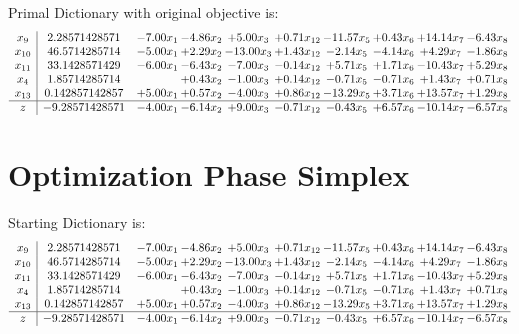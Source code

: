 \documentclass[9pt]{article}
\begin{document}
Primal Dictionary with original objective is:
\[\begin{array}{c| c c@{\hskip 2pt} c@{\hskip 2pt} c@{\hskip 2pt} c@{\hskip 2pt} c@{\hskip 2pt} c@{\hskip 2pt} c@{\hskip 2pt} c@{\hskip 2pt} }
 x_{9}   &  2.28571428571 & -7.00 x_{1} & -4.86 x_{2} & +  5.00 x_{3} & +  0.71 x_{12} & -11.57 x_{5} & +  0.43 x_{6} & + 14.14 x_{7} & -6.43 x_{8}\\
 x_{10}   &  46.5714285714 & -5.00 x_{1} & +  2.29 x_{2} & -13.00 x_{3} & +  1.43 x_{12} & -2.14 x_{5} & -4.14 x_{6} & +  4.29 x_{7} & -1.86 x_{8}\\
 x_{11}   &  33.1428571429 & -6.00 x_{1} & -6.43 x_{2} & -7.00 x_{3} & -0.14 x_{12} & +  5.71 x_{5} & +  1.71 x_{6} & -10.43 x_{7} & +  5.29 x_{8}\\
 x_{4}   &  1.85714285714  &   & +  0.43 x_{2} & -1.00 x_{3} & +  0.14 x_{12} & -0.71 x_{5} & -0.71 x_{6} & +  1.43 x_{7} & +  0.71 x_{8}\\
 x_{13}   &  0.142857142857 & +  5.00 x_{1} & +  0.57 x_{2} & -4.00 x_{3} & +  0.86 x_{12} & -13.29 x_{5} & +  3.71 x_{6} & + 13.57 x_{7} & +  1.29 x_{8}\\
\hline
z    &  -9.28571428571 & -4.00 x_{1} & -6.14 x_{2} & +  9.00 x_{3} & -0.71 x_{12} & -0.43 x_{5} & +  6.57 x_{6} & -10.14 x_{7} & -6.57 x_{8}\\
\end{array}\]
\section{Optimization Phase Simplex}
Starting Dictionary is:
\[\begin{array}{c| c c@{\hskip 2pt} c@{\hskip 2pt} c@{\hskip 2pt} c@{\hskip 2pt} c@{\hskip 2pt} c@{\hskip 2pt} c@{\hskip 2pt} c@{\hskip 2pt} }
 x_{9}   &  2.28571428571 & -7.00 x_{1} & -4.86 x_{2} & +  5.00 x_{3} & +  0.71 x_{12} & -11.57 x_{5} & +  0.43 x_{6} & + 14.14 x_{7} & -6.43 x_{8}\\
 x_{10}   &  46.5714285714 & -5.00 x_{1} & +  2.29 x_{2} & -13.00 x_{3} & +  1.43 x_{12} & -2.14 x_{5} & -4.14 x_{6} & +  4.29 x_{7} & -1.86 x_{8}\\
 x_{11}   &  33.1428571429 & -6.00 x_{1} & -6.43 x_{2} & -7.00 x_{3} & -0.14 x_{12} & +  5.71 x_{5} & +  1.71 x_{6} & -10.43 x_{7} & +  5.29 x_{8}\\
 x_{4}   &  1.85714285714  &   & +  0.43 x_{2} & -1.00 x_{3} & +  0.14 x_{12} & -0.71 x_{5} & -0.71 x_{6} & +  1.43 x_{7} & +  0.71 x_{8}\\
 x_{13}   &  0.142857142857 & +  5.00 x_{1} & +  0.57 x_{2} & -4.00 x_{3} & +  0.86 x_{12} & -13.29 x_{5} & +  3.71 x_{6} & + 13.57 x_{7} & +  1.29 x_{8}\\
\hline
z    &  -9.28571428571 & -4.00 x_{1} & -6.14 x_{2} & +  9.00 x_{3} & -0.71 x_{12} & -0.43 x_{5} & +  6.57 x_{6} & -10.14 x_{7} & -6.57 x_{8}\\
\end{array}\]
\end{document}
